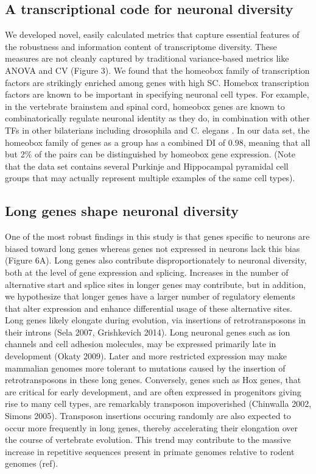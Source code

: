 \subsection{A transcriptional code for neuronal diversity}
We developed novel, easily calculated metrics that capture essential features of the robustness and information content of transcriptome diversity. These measures are not cleanly captured by traditional variance-based metrics like ANOVA and CV (Figure 3). We found that the homeobox family of transcription factors are strikingly enriched among genes with high SC. Homebox transcription factors are known to be important in specifying neuronal cell types. For example, in the vertebrate brainstem and spinal cord, homeobox genes are known to combinatorically regulate neuronal identity \cite{Dasen_2009}\cite{Philippidou_2013} as they do, in combination with other TFs in other bilaterians including drosophila and C. elegans \cite{Kratsios_2017}. In our data set, the homeobox family of genes as a group has a combined DI of 0.98, meaning that all but 2\% of the pairs can be distinguished by homeobox gene expression. (Note that the data set contains several Purkinje and Hippocampal pyramidal cell groups that may actually represent multiple examples of the same cell types).

\subsection{Long genes shape neuronal diversity}
One of the most robust findings in this study is that genes specific to neurons are biased toward long genes whereas genes not expressed in neurons lack this bias (Figure 6A). Long genes also contribute disproportionately to neuronal diversity, both at the level of gene expression and splicing. Increases in the number of alternative start and splice sites in longer genes may contribute, but in addition, we hypothesize that longer genes have a larger number of regulatory elements that alter expression and enhance differential usage of these alternative sites. Long genes likely elongate during evolution, via insertions of retrotransposons in their introns (Sela 2007, Grishkevich 2014). Long neuronal genes such as ion channels and cell adhesion molecules, may be expressed primarily late in development (Okaty 2009). Later and more restricted expression may make mammalian genomes more tolerant to mutations caused by the insertion of retrotransposons in these long genes. Conversely, genes such as Hox genes, that are critical for early development, and are often expressed in progenitors giving rise to many cell types, are remarkably transposon impoverished (Chinwalla 2002, Simons 2005). Transposon insertions occuring randomly are also expected to occur more frequently in long genes, thereby accelerating their elongation over the course of vertebrate evolution. This trend may contribute to the massive increase in repetitive sequences present in primate genomes relative to rodent genomes (ref).

